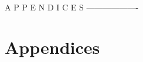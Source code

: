 


\cleardoublepage 
{}

\renewcommand*{\bibname}{References} %


\nocite{*}


A P P E N D I C E S
-------------------
\appendix
\chapter*{Appendices}


